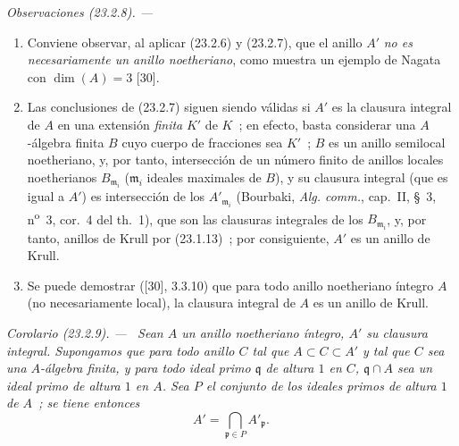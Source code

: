 \documentclass[10pt,oneside]{book}
\makeatletter
\newcommand{\setmanualcurrentlabel}[1]{\def\@currentlabel{#1}}
\newenvironment{corollary}[1][]{%
  \setmanualcurrentlabel{#1}\par\medskip\noindent\itshape Corolario (#1). ---\ }{\par}
\newenvironment{remarks}[1][]{%
  \setmanualcurrentlabel{#1}\par\medskip\noindent\itshape Observaciones (#1). ---\ }{\par}
\makeatother
\begin{document}
\begin{remarks}[23.2.8]
\label{0.23.2.8-es}
\begin{enumerate}
  \item[(i)] Conviene observar, al aplicar (23.2.6) y
  (23.2.7), que el anillo $A'$ \emph{no es necesariamente un anillo
  noetheriano}, como muestra un ejemplo de Nagata con $\dim(A)=3$ [30].

  \item[(ii)] Las conclusiones de (23.2.7) siguen siendo válidas si $A'$ es
  la clausura integral de $A$ en una extensión \emph{finita} $K'$ de $K$~; en efecto,
  basta considerar una $A$-álgebra finita $B$ cuyo cuerpo de fracciones sea
  $K'$~; $B$ es un anillo semilocal noetheriano, y, por tanto,
  intersección de un número finito de anillos locales noetherianos
  $B_{\mathfrak m_i}$ ($\mathfrak m_i$ ideales maximales de $B$), y su clausura
  integral (que es igual a $A'$) es intersección de los
  $A'_{\mathfrak m_i}$ (Bourbaki, \emph{Alg. comm.}, cap.~II, §~3,
  n\textsuperscript{o}~3, cor.~4 del th.~1), que son las clausuras integrales
  de los $B_{\mathfrak m_i}$, y, por tanto, anillos de Krull por (23.1.13)~; por
  consiguiente, $A'$ es un anillo de Krull.

  \item[(iii)] Se puede demostrar ([30], 3.3.10) que para todo anillo noetheriano
  íntegro $A$ (no necesariamente local), la clausura integral de $A$ es un
  anillo de Krull.
\end{enumerate}
\end{remarks}

\begin{corollary}[23.2.9]
\label{0.23.2.9-es}
Sean $A$ un anillo noetheriano íntegro, $A'$ su clausura integral. Supongamos
que para todo anillo $C$ tal que $A\subset C\subset A'$ y tal que $C$ sea
una $A$-álgebra finita, y para todo ideal primo $\mathfrak q$ de altura $1$
en $C$, $\mathfrak q\cap A$ sea un ideal primo de altura $1$ en $A$.
Sea $P$ el conjunto de los ideales primos de altura $1$ de $A$~; se tiene entonces
\[
  A'=\bigcap_{\mathfrak p\in P}A'_{\mathfrak p}.
\]
\end{corollary}
\end{document}
